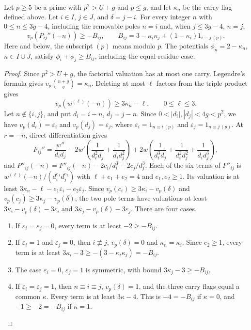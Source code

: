 \begin{lemma}\label{lem:one-carry}
Let \(p\ge5\) be a prime with \(p^2>U+g\) and \(p\le g\), and let \(\kappa_n\) be the carry flag defined above. Let \(i\in I\), \(j\in J\), and \(\delta=j-i\). For every integer \(n\) with \(0\le n\le3g-4\), including the removable poles \(n=i\) and, when \(j\le3g-4\), \(n=j\),
\[
 v_p(P_{ij}''(-n))\ge -B_{ij},\qquad
 B_{ij}=3-\kappa_i\kappa_j+(1-\kappa_i)1_{i\equiv j\,(p)}.
\]
Here and below, the subscript \((p)\) means modulo \(p\). The potentials \(\phi_n=2-\kappa_n\), \(n\in I\cup J\), satisfy \(\phi_i+\phi_j\ge B_{ij}\), including the equal-residue case.
\end{lemma}

\begin{proof}
Since \(p^2>U+g\), the factorial valuation has at most one carry. Legendre's formula gives \(v_p\binom{n+g}{g}=\kappa_n\). Deleting at most \(\ell\) factors from the triple product gives
\[
 v_p(w^{(\ell)}(-n))\ge3\kappa_n-\ell,\qquad 0\le\ell\le3.
\]
Let \(n\notin\{i,j\}\), and put \(d_i=i-n\), \(d_j=j-n\). Since \(0<|d_i|,|d_j|<4g<p^2\), we have \(v_p(d_i)=\varepsilon_i\) and \(v_p(d_j)=\varepsilon_j\), where \(\varepsilon_i=1_{n\equiv i\,(p)}\) and \(\varepsilon_j=1_{n\equiv j\,(p)}\). At \(r=-n\), direct differentiation gives
\[
 F_{ij}''=\frac{w''}{d_i d_j}
 -2w'\left(\frac1{d_i^2d_j}+\frac1{d_i d_j^2}\right)
 +2w\left(\frac1{d_i^3d_j}+\frac1{d_i^2d_j^2}+\frac1{d_i d_j^3}\right),
\]
and \(P''_{ij}(-n)=F''_{ij}(-n)-2c_i/d_i^3-2c_j/d_j^3\). Each of the six terms of \(F''_{ij}\) is \(w^{(\ell)}(-n)/(d_i^{e_1}d_j^{e_2})\) with \(\ell+e_1+e_2=4\) and \(e_1,e_2\ge1\). Its valuation is at least \(3\kappa_n-\ell-e_1\varepsilon_i-e_2\varepsilon_j\). Since \(v_p(c_i)\ge3\kappa_i-v_p(\delta)\) and \(v_p(c_j)\ge3\kappa_j-v_p(\delta)\), the two pole terms have valuations at least \(3\kappa_i-v_p(\delta)-3\varepsilon_i\) and \(3\kappa_j-v_p(\delta)-3\varepsilon_j\). There are four cases.
\begin{enumerate}
\item If \(\varepsilon_i=\varepsilon_j=0\), every term is at least \(-2\ge-B_{ij}\).
\item If \(\varepsilon_i=1\) and \(\varepsilon_j=0\), then \(i\not\equiv j\), \(v_p(\delta)=0\) and \(\kappa_n=\kappa_i\). Since \(e_2\ge1\), every term is at least \(3\kappa_i-3\ge-(3-\kappa_i\kappa_j)=-B_{ij}\).
\item The case \(\varepsilon_i=0\), \(\varepsilon_j=1\) is symmetric, with bound \(3\kappa_j-3\ge-B_{ij}\).
\item If \(\varepsilon_i=\varepsilon_j=1\), then \(n\equiv i\equiv j\), \(v_p(\delta)=1\), and the three carry flags equal a common \(\kappa\). Every term is at least \(3\kappa-4\). This is \(-4=-B_{ij}\) if \(\kappa=0\), and \(-1\ge-2=-B_{ij}\) if \(\kappa=1\).

\end{enumerate}
\end{proof}
